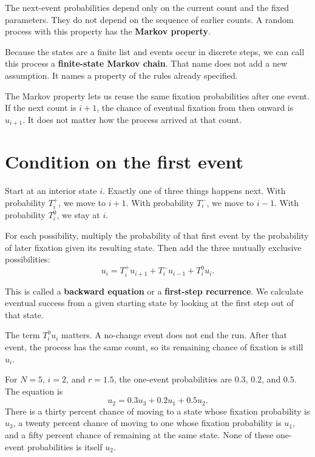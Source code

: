 The next-event probabilities depend only on the current count and the fixed
parameters. They do not depend on the sequence of earlier counts. A random
process with this property has the \textbf{Markov property}.

Because the states are a finite list and events occur in discrete steps,
we can call this process a \textbf{finite-state Markov chain}. That name
does not add a new assumption. It names a property of the rules already
specified.

The Markov property lets us reuse the same fixation probabilities after
one event. If the next count is \(i+1\), the chance of eventual fixation
from then onward is \(u_{i+1}\). It does not matter how the process arrived
at that count.

\section{Condition on the first event}

Start at an interior state \(i\). Exactly one of three things happens next.
With probability \(T_i^+\), we move to \(i+1\). With probability
\(T_i^-\), we move to \(i-1\). With probability \(T_i^0\), we stay at
\(i\).

For each possibility, multiply the probability of that first event by the
probability of later fixation given its resulting state. Then add the three
mutually exclusive possibilities:
\begin{equation}
 u_i=T_i^+u_{i+1}+T_i^-u_{i-1}+T_i^0u_i.
 \label{eq:backward-first-step}
\end{equation}

This is called a \textbf{backward equation} or a \textbf{first-step
recurrence}. We calculate eventual success from a given starting state by
looking at the first step out of that state.

The term \(T_i^0u_i\) matters. A no-change event does not end the run.
After that event, the process has the same count, so its remaining chance
of fixation is still \(u_i\).

\begin{workedexample}
For \(N=5\), \(i=2\), and \(r=1.5\), the one-event probabilities are
\(0.3\), \(0.2\), and \(0.5\). The equation is
\[
 u_2=0.3u_3+0.2u_1+0.5u_2.
\]
There is a thirty percent chance of moving to a state whose fixation
probability is \(u_3\), a twenty percent chance of moving to one whose
fixation probability is \(u_1\), and a fifty percent chance of remaining
at the same state. None of these one-event probabilities is itself \(u_2\).
\end{workedexample}

